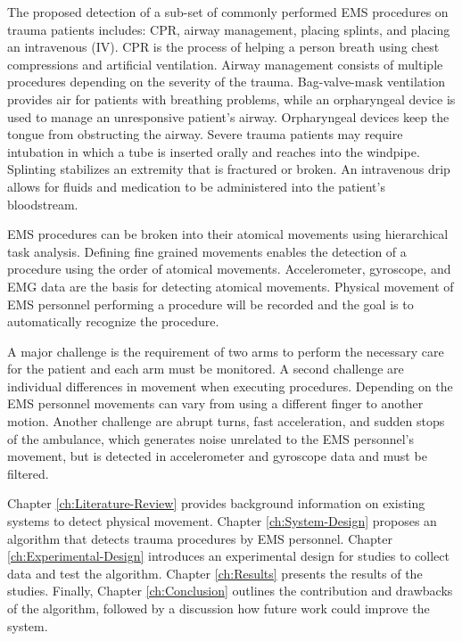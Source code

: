 \par The proposed detection of a sub-set of commonly performed EMS procedures on trauma patients includes: \gls{CPR}, airway management, placing splints, and placing an intravenous (\gls{IV}). CPR is the process of helping a person breath using chest compressions and artificial ventilation. Airway management consists of multiple procedures depending on the severity of the trauma. Bag-valve-mask ventilation provides air for patients with breathing problems, while an orpharyngeal device is used to manage an unresponsive patient's airway. Orpharyngeal devices keep the tongue from obstructing the airway. Severe trauma patients may require intubation in which a tube is inserted orally and reaches into the windpipe. Splinting stabilizes an extremity that is fractured or broken. An intravenous drip allows for fluids and medication to be administered into the patient’s bloodstream.
\par EMS procedures can be broken into their atomical movements using hierarchical task analysis. Defining fine grained movements enables the detection of a procedure using the order of atomical movements. Accelerometer, gyroscope, and \gls{EMG} data are the basis for detecting atomical movements. Physical movement of \gls{EMS} personnel performing a procedure will be recorded and the goal is to automatically recognize the procedure.
\par A major challenge is the requirement of two arms to perform the necessary care for the patient and each arm must be monitored. A second challenge are individual differences in movement when executing procedures. Depending on the EMS personnel movements can vary from using a different finger to another motion. Another challenge are abrupt turns, fast acceleration, and sudden stops of the ambulance, which generates noise unrelated to the EMS personnel's movement, but is detected in accelerometer and gyroscope data and must be filtered.
\par Chapter \ref{ch:Literature-Review} provides background information on existing systems to detect physical movement. Chapter \ref{ch:System-Design} proposes an algorithm that detects trauma procedures by \gls{EMS} personnel. Chapter \ref{ch:Experimental-Design} introduces an experimental design for studies to collect data and test the algorithm. Chapter \ref{ch:Results} presents the results of the studies. Finally, Chapter \ref{ch:Conclusion} outlines the contribution and drawbacks of the algorithm, followed by a discussion how future work could improve the system. 